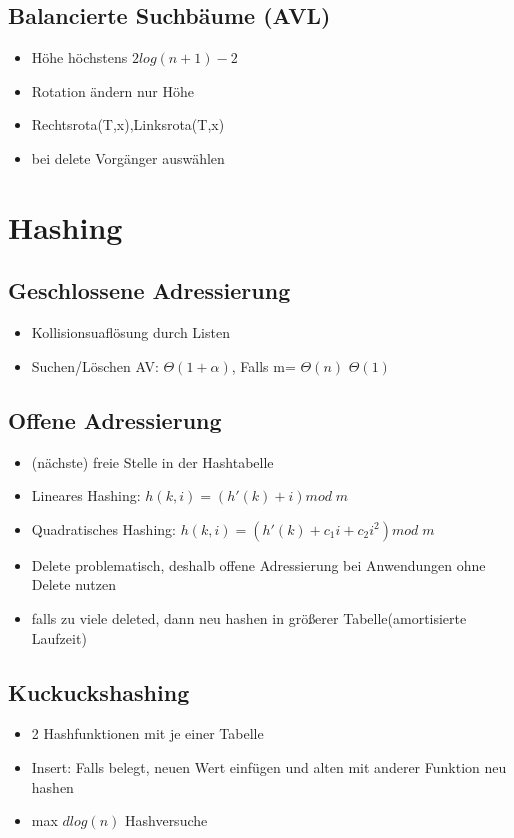 \documentclass{article}
\begin{document}
\subsection{Balancierte Suchb{\"a}ume (AVL)}
\begin{itemize}
\item H{\"o}he h{\"o}chstens $2log(n+1)-2$
\item Rotation {\"a}ndern nur H{\"o}he
\item Rechtsrota(T,x),Linksrota(T,x)
\item bei delete Vorgänger auswählen
\end{itemize}

\section{Hashing}
\subsection{Geschlossene Adressierung}
\begin{itemize}
\item Kollisionsuafl{\"o}sung durch Listen
\item Suchen/L{\"o}schen AV: $\Theta(1+\alpha)$, Falls  m= $\Theta(n)$ $\Theta(1)$
\end{itemize}


\subsection{Offene Adressierung}
\begin{itemize}
\item (n{\"a}chste) freie Stelle in der Hashtabelle
\item Lineares Hashing: $h(k,i) = (h'(k) +i) mod \; m$
\item Quadratisches Hashing: $h(k,i) = (h'(k) +c_1i+ c_2 i^2) mod \; m$
\item Delete problematisch, deshalb offene Adressierung bei Anwendungen ohne Delete nutzen
\item falls zu viele deleted, dann neu hashen in gr{\"o}\ss erer Tabelle(amortisierte Laufzeit)
\end{itemize}

\subsection{Kuckuckshashing}
\begin{itemize}
\item 2 Hashfunktionen mit je einer Tabelle
\item Insert: Falls belegt, neuen Wert einf{\"u}gen und alten mit anderer Funktion neu hashen
\item max $d log(n)$ Hashversuche
\end{itemize}
\end{document}
